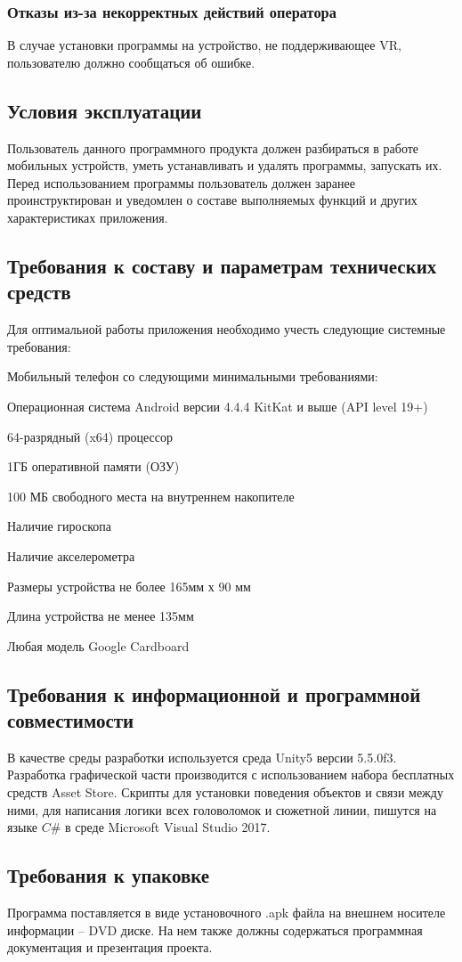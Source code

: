 \subsubsection{Отказы из-за некорректных действий оператора}
В случае установки программы на устройство, не поддерживающее VR, пользователю должно сообщаться об ошибке.


\subsection{Условия эксплуатации}
Пользователь данного программного продукта должен разбираться в работе мобильных устройств, уметь устанавливать и удалять программы, запускать их. Перед использованием программы пользователь должен заранее проинструктирован и уведомлен о составе выполняемых функций и других характеристиках приложения.


\subsection{Требования к составу и параметрам технических средств}
Для оптимальной работы приложения необходимо учесть следующие системные требования:
\begin{my_enumerate}
\item Мобильный телефон со следующими минимальными требованиями:
    \begin{my_enumerate}
   	\item Операционная система Android версии 4.4.4 KitKat и выше (API level 19+)
    \item 64-разрядный (x64) процессор
    \item 1ГБ оперативной памяти (ОЗУ)
    \item 100 МБ свободного места на внутреннем накопителе
    \item Наличие гироскопа
    \item Наличие акселерометра
    \item Размеры устройства не более 165мм х 90 мм
    \item Длина устройства не менее 135мм
    \end{my_enumerate}
\item Любая модель Google Cardboard
\end{my_enumerate}


\subsection{Требования к информационной и программной совместимости}
В качестве среды разработки используется среда Unity5 версии 5.5.0f3.
Разработка графической части производится с использованием набора бесплатных средств Asset Store.
Скрипты для установки поведения объектов и связи между ними, для написания логики всех головоломок и сюжетной линии, пишутся на языке $C\#$ в среде Microsoft Visual Studio 2017. 


\subsection{Требования к упаковке}
Программа поставляется в виде установочного .apk файла на внешнем носителе информации – DVD диске. На нем также должны содержаться программная документация и презентация проекта.
